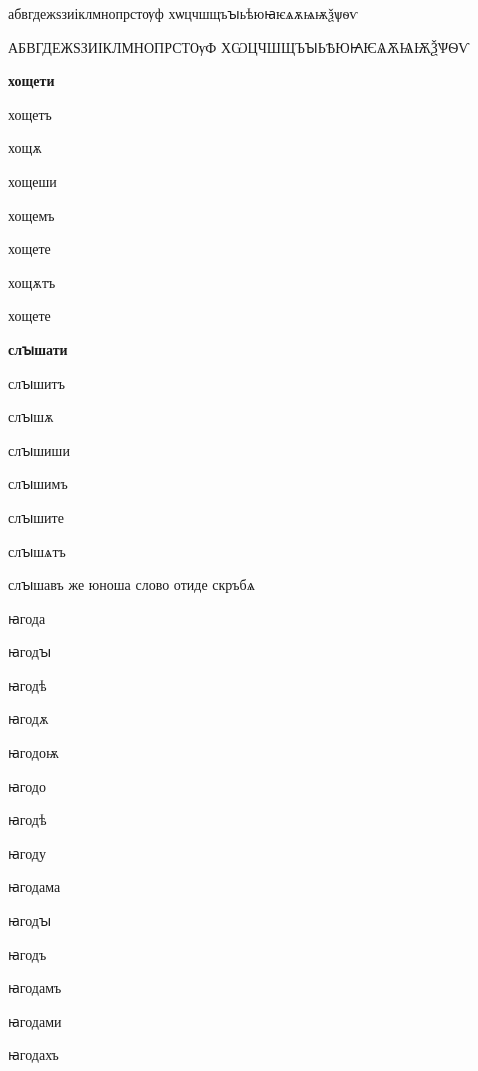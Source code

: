 \documentclass{article}
\begin{document}
	\raggedright
	абвгдежѕзиіклмнопрстѹф%
	хѡцчшщъꙑьѣюꙗѥѧѫѩѭѯѱѳѵ
	
	\uppercase{абвгдежѕзиіклмнопрстѹф
		хѡцчшщъꙑьѣюꙗѥѧѫѩѭѯѱѳѵ}
	
	\textbf{хощети}
	
	хощетъ
	
	хощѫ
	
	хощеши
	
	хощемъ
	
	хощете
	
	хощѫтъ
	
	хощете
	
	
	\textbf{слꙑшати}
	
	слꙑшитъ
	
	слꙑшѫ
	
	слꙑшиши
	
	слꙑшимъ
	
	слꙑшите
	
	слꙑшѧтъ
	
	слꙑшавъ же юноша слово отиде скръбѧ
	
	ꙗгода
	
	ꙗгодꙑ
	
	ꙗгодѣ
	
	ꙗгодѫ
	
	ꙗгодоѭ
	
	ꙗгодо
	
	ꙗгодѣ
	
	ꙗгоду
	
	ꙗгодама
	
	ꙗгодꙑ
	
	ꙗгодъ
	
	ꙗгодамъ
	
	ꙗгодами
	
	ꙗгодахъ
	
	
\end{document}
